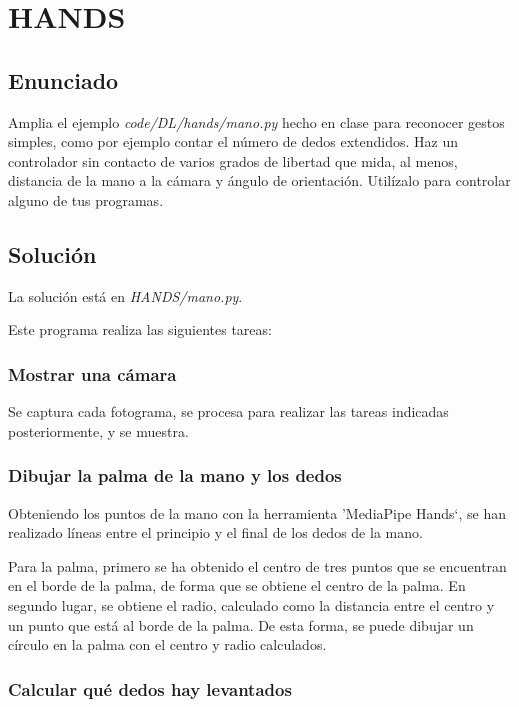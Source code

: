 \documentclass[12pt]{article}
\begin{document}

\tableofcontents
\pagebreak

\listoffigures
\pagebreak

\section{HANDS}
\subsection*{Enunciado}
Amplia el ejemplo \textit{code/DL/hands/mano.py} hecho en clase para reconocer gestos simples, como por ejemplo contar el número de dedos extendidos. Haz un controlador sin contacto de varios grados de libertad que mida, al menos, distancia de la mano a la cámara y ángulo de orientación. Utilízalo para controlar alguno de tus programas.

\subsection*{Solución}
La solución está en \textit{HANDS/mano.py}.

Este programa realiza las siguientes tareas:
\subsubsection*{Mostrar una cámara}
Se captura cada fotograma, se procesa para realizar las tareas indicadas posteriormente, y se muestra.

\subsubsection*{Dibujar la palma de la mano y los dedos}

Obteniendo los puntos de la mano con la herramienta 'MediaPipe Hands`, se han realizado líneas entre el principio y el final de los dedos de la mano. 

Para la palma, primero se ha obtenido el centro de tres puntos que se encuentran en el borde de la palma, de forma que se obtiene el centro de la palma. En segundo lugar, se obtiene el radio, calculado como la distancia entre el centro y un punto que está al borde de la palma. De esta forma, se puede dibujar un círculo en la palma con el centro y radio calculados.

\subsubsection*{Calcular qué dedos hay levantados}
\end{document}
